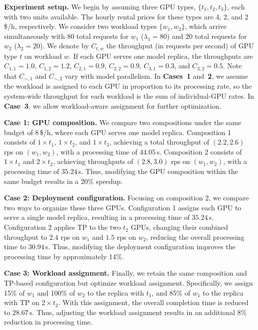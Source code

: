 \textbf{Experiment setup.}
We begin by assuming three GPU types, $\{t_1,t_2,t_3\}$, each with two units available. The hourly rental prices for these types are 4, 2, and 2\,\$/h, respectively. We consider two workload types $\{w_1, w_2\}$, which arrive simultaneously with 80 total requests for $w_1$ ($\lambda_1=80$) and 20 total requests for $w_2$ ($\lambda_2=20$). We denote by $C_{t,w}$ the throughput (in requests per second) of GPU type $t$ on workload $w$. If each GPU serves one model replica, the throughputs are $C_{1,1}=1.0$, $C_{1,2}=1.2$, $C_{2,1}=0.9$, $C_{2,2}=0.9$,
$C_{3,1}=0.3$, and $C_{3,2}=0.5$. Note that $C_{\sim,1}$ and $C_{\sim,2}$ vary with model parallelism. In \textbf{Cases~1} and~\textbf{2}, we assume the workload is assigned to each GPU in proportion to its processing rate, so the system-wide throughput for each workload is the sum of individual-GPU rates. In \textbf{Case~3}, we allow workload-aware assignment for further optimization.

\textbf{Case 1: GPU composition.}
We compare two compositions under the same budget of 8\,\$/h, where each GPU serves one model replica.
Composition 1 consists of $1\times t_1$, $1\times t_2$, and $1\times t_3$, achieving a total throughput of $(2.2, 2.6)$ rps on $(w_1, w_2)$, with a processing time of $44.05$\,s.
Composition 2 consists of $1\times t_1$ and $2\times t_2$, achieving throughputs of $(2.8, 3.0)$ rps on $(w_1, w_2)$, with a processing time of $35.24$\,s.
Thus, modifying the GPU composition within the same budget results in a 20\% speedup.


\textbf{Case 2: Deployment configuration.}
Focusing on composition 2, we compare two ways to organize these three GPUs.
Configuration 1 assigns each GPU to serve a single model replica, resulting in a processing time of $35.24$\,s.
Configuration 2 applies TP to the two $t_2$ GPUs, changing their combined throughput to $2.4$ rps on $w_1$ and $1.5$ rps on $w_2$, reducing the overall processing time to $30.94$\,s.
Thus, modifying the deployment configuration improves the processing time by approximately 14\%.



\textbf{Case 3: Workload assignment.}
Finally, we retain the same composition and TP-based configuration but optimize workload assignment. Specifically, we assign 15\% of $w_1$ and 100\% of $w_2$ to the replica with $t_1$, and 85\% of $w_1$ to the replica with TP on $2\times t_2$.
With this assignment, the overall completion time is reduced to $28.67$\,s.
Thus, adjusting the workload assignment results in an additional 8\% reduction in processing time.

